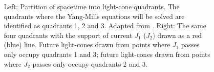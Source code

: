 \begin{figure}\centering
  \hspace{.2\linewidth}
	\caption{
    Left: Partition of spacetime into light-cone quadrants. The quadrants where the Yang-Mills equations will be solved are identified as quadrants 1, 2 and 3. Adapted from \cite{Kovner:1995ja}.
    Right: The same four quadrants with the support of current $J_1$ ($J_2$) drawn as a red (blue) line. Future light-cones drawn from points where $J_1$ passes only occupy quadrants 1 and 3; future light-cones drawn from points where $J_2$ passes only occupy quadrants 2 and 3.
  }
\end{figure}



